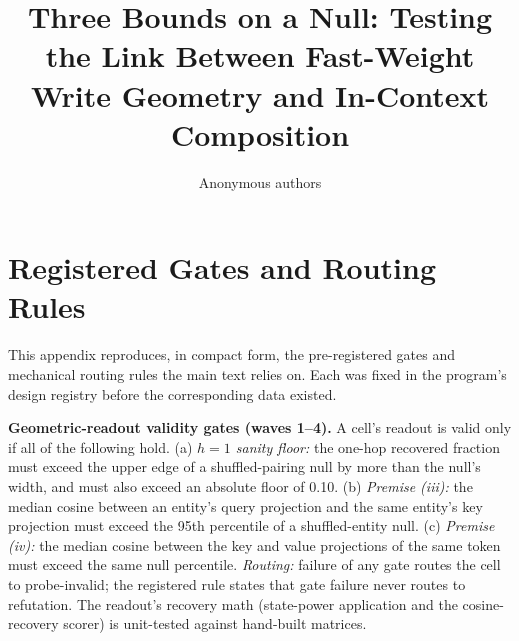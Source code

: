 \documentclass{article} %
\title{Three Bounds on a Null: Testing the Link Between Fast-Weight Write
Geometry and In-Context Composition}
\author{Anonymous authors}
\begin{document}
\ifcolmsubmission
\linenumbers
\fi

\maketitle













\appendix

\section{Registered Gates and Routing Rules}
\label{app:gates}

This appendix reproduces, in compact form, the pre-registered gates and
mechanical routing rules the main text relies on. Each was fixed in the
program's design registry before the corresponding data existed.

\textbf{Geometric-readout validity gates (waves 1--4).} A cell's readout is
valid only if all of the following hold. (a) \emph{$h{=}1$ sanity floor:}
the one-hop recovered fraction must exceed the upper edge of a
shuffled-pairing null by more than the null's width, and must also exceed
an absolute floor of 0.10. (b) \emph{Premise (iii):} the median cosine
between an entity's query projection and the same entity's key projection
must exceed the 95th percentile of a shuffled-entity null. (c)
\emph{Premise (iv):} the median cosine between the key and value
projections of the same token must exceed the same null percentile.
\emph{Routing:} failure of any gate routes the cell to probe-invalid; the
registered rule states that gate failure never routes to refutation.
The readout's recovery math (state-power application and the
cosine-recovery scorer) is unit-tested against hand-built matrices.
\end{document}
